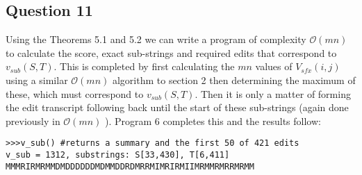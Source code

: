 \documentclass{article}
\begin{document}
\subsection{Question 11}

Using the Theorems 5.1 and 5.2 we can write a program of complexity $\mathcal{O}(mn)$ to calculate the score, exact sub-strings and required edits that correspond to $v_{sub}(S,T)$. This is completed by first calculating the $mn$ values of $V_{sfx}(i,j)$ using a similar $\mathcal{O}(mn)$ algorithm to section 2 then determining the maximum of these, which must correspond to $v_{sub}(S,T)$. Then it is only a matter of forming the edit transcript following back until the start of these sub-strings (again done previously in $\mathcal{O}(mn)$ ). Program 6 completes this and the results follow:

\begin{lstlisting}
>>>v_sub() #returns a summary and the first 50 of 421 edits
v_sub = 1312, substrings: S[33,430], T[6,411]
MMMRIRMRMMDMDDDDDDMDMMDDRDMRRMIMRIRMIIMRMMRMRRMRMM 
\end{lstlisting}
\end{document}
